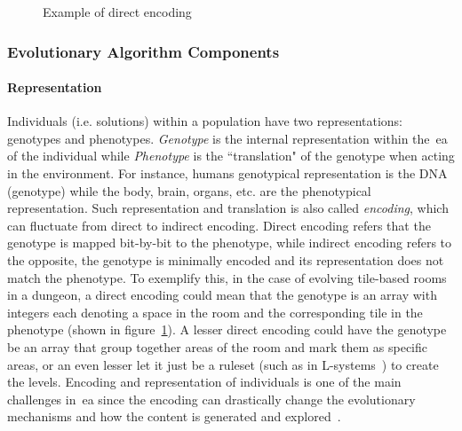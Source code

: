 \begin{figure}
    \centering
     \hfill
    
    \caption{Example of direct encoding}
    \label{fig:directENCOD}
\end{figure}

\subsubsection{Evolutionary Algorithm Components}

\paragraph{Representation}
Individuals (i.e. solutions) within a population have two representations: genotypes and phenotypes. \emph{Genotype} is the internal representation within the~\acrshort{ea} of the individual while \emph{Phenotype} is the ``translation" of the genotype when acting in the environment. For instance, humans genotypical representation is the DNA (genotype) while the body, brain, organs, etc. are the phenotypical representation. Such representation and translation is also called \emph{encoding}, which can fluctuate from direct to indirect encoding. Direct encoding refers that the genotype is mapped bit-by-bit to the phenotype, while indirect encoding refers to the opposite, the genotype is minimally encoded and its representation does not match the phenotype. To exemplify this, in the case of evolving tile-based rooms in a dungeon, a direct encoding could mean that the genotype is an array with integers each denoting a space in the room and the corresponding tile in the phenotype (shown in figure~\ref{fig:directENCOD}). A lesser direct encoding could have the genotype be an array that group together areas of the room and mark them as specific areas, or an even lesser let it just be a ruleset (such as in L-systems~\cite{Lindenmayer1996-LSystems,shaker2012evolving}) to create the levels. Encoding and representation of individuals is one of the main challenges in~\acrshort{ea} since the encoding can drastically change the evolutionary mechanisms and how the content is generated and explored~\cite{Ashlock2016-RepresentationsSearchBased,Clune2011-IndirectEncoding,Stanley2007-CPPN}.


